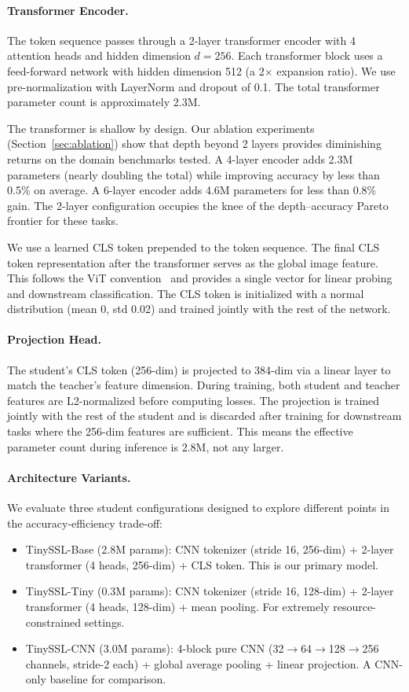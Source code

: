 \documentclass{article}
\newcommand{\method}{TinySSL}
\begin{document}
\paragraph{Transformer Encoder.}
The token sequence passes through a 2-layer transformer encoder with 4 attention heads and hidden dimension $d=256$. Each transformer block uses a feed-forward network with hidden dimension 512 (a 2$\times$ expansion ratio). We use pre-normalization with LayerNorm and dropout of 0.1. The total transformer parameter count is approximately 2.3M.

The transformer is shallow by design. Our ablation experiments (Section~\ref{sec:ablation}) show that depth beyond 2 layers provides diminishing returns on the domain benchmarks tested. A 4-layer encoder adds 2.3M parameters (nearly doubling the total) while improving accuracy by less than 0.5\% on average. A 6-layer encoder adds 4.6M parameters for less than 0.8\% gain. The 2-layer configuration occupies the knee of the depth--accuracy Pareto frontier for these tasks.

We use a learned CLS token prepended to the token sequence. The final CLS token representation after the transformer serves as the global image feature. This follows the ViT convention~\cite{vit} and provides a single vector for linear probing and downstream classification. The CLS token is initialized with a normal distribution (mean 0, std 0.02) and trained jointly with the rest of the network.

\paragraph{Projection Head.}
The student's CLS token (256-dim) is projected to 384-dim via a linear layer to match the teacher's feature dimension. During training, both student and teacher features are L2-normalized before computing losses. The projection is trained jointly with the rest of the student and is discarded after training for downstream tasks where the 256-dim features are sufficient. This means the effective parameter count during inference is 2.8M, not any larger.

\paragraph{Architecture Variants.}
We evaluate three student configurations designed to explore different points in the accuracy-efficiency trade-off:

\begin{itemize}
    \item \method-Base (2.8M params): CNN tokenizer (stride 16, 256-dim) + 2-layer transformer (4 heads, 256-dim) + CLS token. This is our primary model.
    \item \method-Tiny (0.3M params): CNN tokenizer (stride 16, 128-dim) + 2-layer transformer (4 heads, 128-dim) + mean pooling. For extremely resource-constrained settings.
    \item \method-CNN (3.0M params): 4-block pure CNN (32$\rightarrow$64$\rightarrow$128$\rightarrow$256 channels, stride-2 each) + global average pooling + linear projection. A CNN-only baseline for comparison.
\end{itemize}
\end{document}
